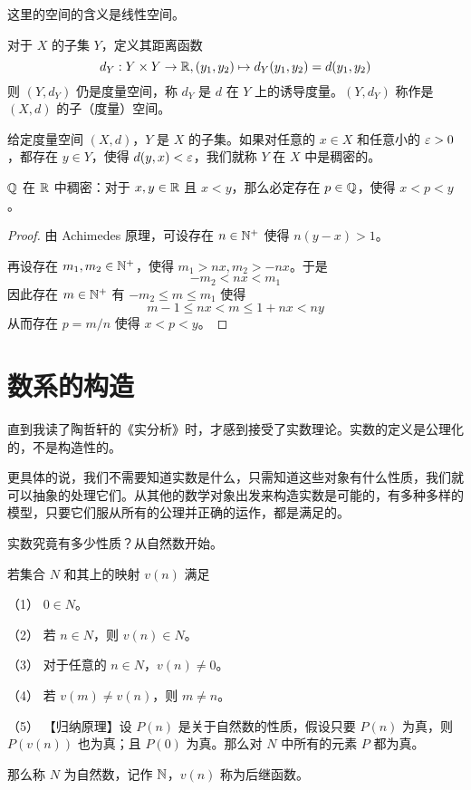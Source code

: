 这里的空间的含义是线性空间。

对于 $X$ 的子集 $Y$，定义其距离函数
$$d_Y: Y \times Y \to \mathbb{R}, (y_1,y_2) \mapsto d_Y(y_1,y_2)=d(y_1,y_2)$$
则 $(Y,d_Y)$ 仍是度量空间，称 $d_Y$ 是 $d$ 在 $Y$ 上的诱导度量。$(Y,d_Y)$ 称作是 $(X,d)$ 的子（度量）空间。

\begin{definition}[稠密性]
	给定度量空间 $(X,d)$，$Y$ 是 $X$ 的子集。如果对任意的 $x\in X$ 和任意小的 $\varepsilon>0$，都存在 $y\in Y$，使得 $d(y,x)<\varepsilon$，我们就称 $Y$ 在 $X$ 中是稠密的。
\end{definition}

\begin{example}
	$\mathbb{Q}$ 在 $\mathbb{R}$ 中稠密：对于 $x,y \in \mathbb{R}$ 且 $x<y$，那么必定存在 $p\in\mathbb{Q}$，使得 $x<p<y$。
\end{example}
\begin{proof}
	由 Achimedes 原理，可设存在 $n\in \mathbb{N}^+$ 使得 $n(y-x)>1$。

	再设存在 $m_1,m_2\in \mathbb{N}^+$，使得 $m_1>nx,m_2>-nx$。于是
	$$-m_2<nx<m_1$$
	因此存在 $m\in \mathbb{N}^+$ 有 $-m_2\leqslant m \leqslant m_1$ 使得
	$$m-1\leqslant nx < m \leqslant 1+nx < ny$$
	从而存在 $p=m/n$ 使得 $x<p<y$。
\end{proof}


\section{数系的构造}

直到我读了陶哲轩的《实分析》时，才感到接受了实数理论。实数的定义是公理化的，不是构造性的。

更具体的说，我们不需要知道实数是什么，只需知道这些对象有什么性质，我们就可以抽象的处理它们。从其他的数学对象出发来构造实数是可能的，有多种多样的模型，只要它们服从所有的公理并正确的运作，都是满足的。

实数究竟有多少性质？从自然数开始。

\begin{axiom}[Peano 公理]
	若集合 $N$ 和其上的映射 $v(n)$ 满足

	（1） $0\in N$。

	（2） 若 $n\in N$，则 $v(n) \in N$。

	（3） 对于任意的 $n\in N$，$v(n) \ne 0$。

	（4） 若 $v(m) \ne v(n)$，则 $m\ne n$。

	（5） 【归纳原理】设 $P(n)$ 是关于自然数的性质，假设只要 $P(n)$ 为真，则 $P(v(n))$ 也为真；且 $P(0)$ 为真。那么对 $N$ 中所有的元素 $P$ 都为真。

	那么称 $N$ 为自然数，记作 $\mathbb{N}$，$v(n)$ 称为后继函数。
\end{axiom}

